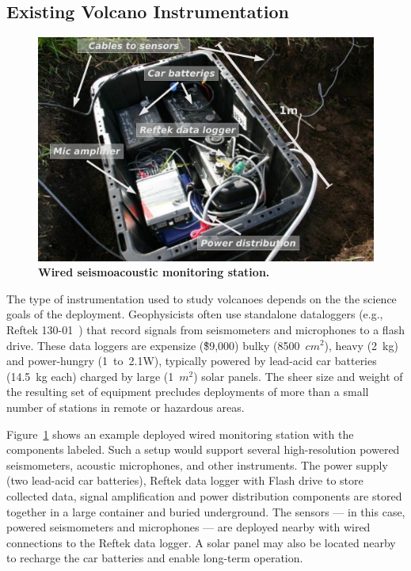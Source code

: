 \subsection{Existing Volcano Instrumentation}

\begin{figure}[t]
\begin{center}
\includegraphics[width=0.9\hsize]{./2-related/figs/Standalone.pdf}
\end{center}
\caption{\textbf{Wired seismoacoustic monitoring station.}}
\label{related-fig-standalone}
\end{figure}

The type of instrumentation used to study volcanoes depends on the the
science goals of the deployment. Geophysicists often use standalone
dataloggers (e.g., Reftek 130-01~\cite{reftek}) that record signals from
seismometers and microphones to a flash drive. These data loggers are
expensize (\~\$9,000) bulky (8500~$cm^2$), heavy (2~kg) and power-hungry
(1~to~2.1W), typically powered by lead-acid car batteries (14.5~kg each)
charged by large (1~$m^2$) solar panels. The sheer size and weight of the
resulting set of equipment precludes deployments of more than a small number
of stations in remote or hazardous areas.

Figure~\ref{related-fig-standalone} shows an example deployed wired
monitoring station with the components labeled. Such a setup would support
several high-resolution powered seismometers, acoustic microphones, and other
instruments. The power supply (two lead-acid car batteries), Reftek data
logger with Flash drive to store collected data, signal amplification and
power distribution components are stored together in a large container and
buried underground. The sensors --- in this case, powered seismometers and
microphones --- are deployed nearby with wired connections to the Reftek data
logger. A solar panel may also be located nearby to recharge the car
batteries and enable long-term operation.

